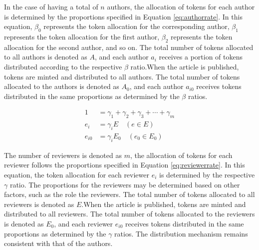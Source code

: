 \documentclass[lettersize,journal]{IEEEtran}
\begin{document}
In the case of having a total of $n$ authors, the allocation of tokens for each author is determined by the proportions specified in Equation \ref{eq:authorrate}. In this equation, $\beta_0$ represents the token allocation for the corresponding author, $\beta_1$ represents the token allocation for the first author, $\beta_2$ represents the token allocation for the second author, and so on. The total number of tokens allocated to all authors is denoted as $A$, and each author $a_i$ receives a portion of tokens distributed according to the respective $\beta$ ratio.When the article is published, tokens are minted and distributed to all authors. The total number of tokens allocated to the authors is denoted as $A_0$, and each author $a_{i0}$ receives tokens distributed in the same proportions as determined by the $\beta$ ratios.

\begin{equation}
  \begin{aligned}
    1 &= \gamma_1 + \gamma_2 + \gamma_3 + \cdots + \gamma_m \\
    e_{i} &= \gamma_i E \quad (e \in E) \\
    e_{i0} &= \gamma_i E_0 \quad (e_0 \in E_0 )
  \end{aligned}
  \label{eq:reviewerrate}
\end{equation}

The number of reviewers is denoted as $m$, the allocation of tokens for each reviewer follows the proportions specified in Equation \ref{eq:reviewerrate}. In this equation, the token allocation for each reviewer $e_i$ is determined by the respective $\gamma$ ratio. The proportions for the reviewers may be determined based on other factors, such as the role the reviewers. The total number of tokens allocated to all reviewers is denoted as $E$.When the article is published, tokens are minted and distributed to all reviewers. The total number of tokens allocated to the reviewers is denoted as $E_0$, and each reviewer $e_{i0}$ receives tokens distributed in the same proportions as determined by the $\gamma$ ratios. The distribution mechanism remains consistent with that of the authors.
\end{document}
